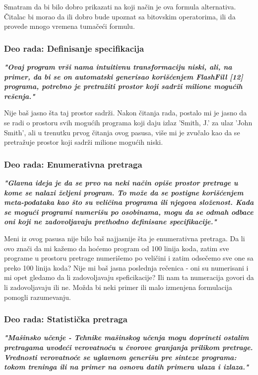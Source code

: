 \documentclass[a4paper]{report}
\begin{document}
Smatram da bi bilo dobro prikazati na koji način je ova formula alternativa. Čitalac bi morao da ili dobro bude upoznat sa bitovskim operatorima, ili da provede mnogo vremena tumačeći formulu.


\subsubsection{Deo rada: Definisanje specifikacija}
\textbf{\textit{"Ovaj program vrši nama intuitivnu transformaciju niski, ali, na primer,
da bi se on automatski generisao korišćenjem FlashFill [12] programa, potrebno je pretražiti prostor koji sadrži milione mogućih rešenja."}}

Nije baš jasno šta taj prostor sadrži. Nakon čitanja rada, postalo mi je jasno da se radi o prostoru svih mogućih programa koji daju izlaz 'Smith, J.' za ulaz 'John Smith', ali u trenutku prvog čitanja ovog pasusa, više mi je zvučalo kao da se pretražuje prostor koji sadrži milione mogućih niski.


\subsubsection{Deo rada: Enumerativna pretraga}
\textbf{\textit{"Glavna ideja je da se prvo na neki način opiše prostor pretrage u kome se nalazi željeni program. To može da se postigne korišćenjem meta-podataka kao što su veličina programa ili
njegova složenost. Kada se mogući programi numerišu po osobinama, mogu da se odmah odbace oni koji ne zadovoljavaju prethodno definisane specifikacije."}}

Meni iz ovog pasusa nije bilo baš najjasnije šta je enumerativna pretraga. Da li ovo znači da mi kažemo da hoćemo program od 100 linija koda, zatim sve programe u prostoru pretrage numerišemo po veličini i zatim odsečemo sve one sa preko 100 linija koda? Nije mi baš jasna poslednja rečenica - oni su numerisani i mi opet gledamo da li zadovoljavaju speficikacije? Ili nam ta numeracija govori da li zadovoljavaju ili ne. Možda bi neki primer ili malo izmenjena formulacija pomogli razumevanju.


\subsubsection{Deo rada: Statistička pretraga}
\textbf{\textit{"Mašinsko učenje - Tehnike mašinskog učenja mogu doprineti ostalim pretragama uvodeći verovatnoću u čvorove granjanja prilikom pretrage. Vrednosti verovatnoće se uglavnom generišu pre sinteze programa: tokom treninga ili na primer na osnovu datih primera ulaza i izlaza."}}
\end{document}
